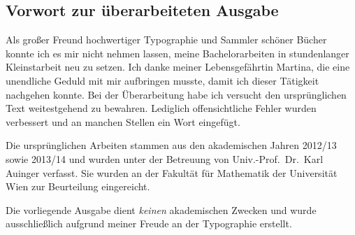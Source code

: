\begingroup
\let\clearpage\relax
\let\cleardoublepage\relax
\let\cleardoublepage\relax

\begin{de}
\chapter*{Vorwort zur überarbeiteten Ausgabe}

Als großer Freund hochwertiger Typographie und Sammler schöner Bücher
konnte ich es mir nicht nehmen lassen, meine Bachelorarbeiten in
stundenlanger Kleinstarbeit neu zu setzen.
Ich danke meiner Lebensgefährtin Martina, die eine unendliche Geduld
mit mir aufbringen musste, damit ich dieser Tätigkeit nachgehen konnte.
Bei der Überarbeitung habe ich versucht den ursprünglichen Text 
weitestgehend zu bewahren.
Lediglich offensichtliche Fehler wurden verbessert und an manchen
Stellen ein Wort eingefügt.

Die ursprünglichen Arbeiten stammen aus den akademischen Jahren 2012/13
sowie 2013/14 und wurden unter der Betreuung von Univ.-Prof.\ Dr.\ Karl 
Auinger verfasst.
Sie wurden an der Fakultät für Mathematik der Universität Wien zur
Beurteilung eingereicht.

Die vorliegende Ausgabe dient \emph{keinen} akademischen Zwecken und
wurde ausschließlich aufgrund meiner Freude an der Typographie
erstellt.
\end{de}
\endgroup			

\vfill